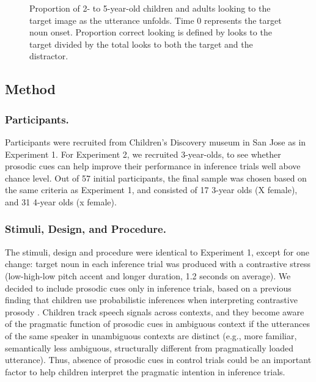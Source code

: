 \documentclass[10pt,letterpaper]{article}
\begin{document}
\begin{figure}[t]
	\caption{\label{fig:age} Proportion of 2- to 5-year-old children and adults looking to the target image as the utterance unfolds. Time 0 represents the target noun onset. Proportion correct looking is defined by looks to the target divided by the total looks to both the target and the distractor.}
\end{figure}

\subsection{Method}

\subsubsection{Participants.}

Participants were recruited from Children's Discovery museum in San Jose as in Experiment 1. For Experiment 2, we recruited 3-year-olds, to see whether prosodic cues can help improve their performance in inference trials well above chance level. Out of 57 initial participants, the final sample was chosen based on the same criteria as Experiment 1, and consisted of 17 3-year olds (X female), and 31 4-year olds (x female).


\subsubsection{Stimuli, Design, and Procedure.}

The stimuli, design and procedure were identical to Experiment 1, except for one change: target noun in each inference trial was produced with a contrastive stress (low-high-low pitch accent and longer duration, 1.2 seconds on average). We decided to include prosodic cues only in inference trials, based on a previous finding that children use probabilistic inferences when interpreting contrastive prosody \cite{kurumada1contextual}. Children track speech signals across contexts, and they become aware of the pragmatic function of prosodic cues in ambiguous context if the utterances of the same speaker in unambiguous contexts are distinct (e.g., more familiar, semantically less ambiguous, structurally different from pragmatically loaded utterance). Thus, absence of prosodic cues in control trials could be an important factor to help children interpret the pragmatic intention in inference trials.
\end{document}
